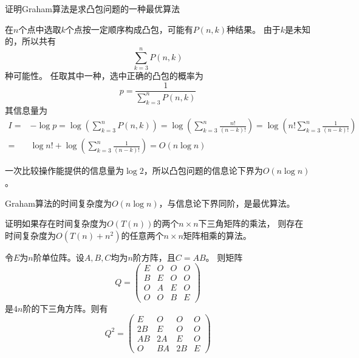 \begin{questions}
\begin{solution}
    \end{solution}

    \question  证明Graham算法是求凸包问题的一种最优算法

    \begin{solution}
        在$n$个点中选取$k$个点按一定顺序构成凸包，可能有$P(n, k)$种结果。
        由于$k$是未知的，所以共有\[
            \sum_{k = 3}^{n} P(n,k)
        \]种可能性。
        任取其中一种，选中正确的凸包的概率为\[
            p = \frac{1}{\sum_{k = 3}^{n} P(n,k)}
        \]
        其信息量为
        \begin{align*}
            I = & - \log p = \log \left( \sum_{k = 3}^{n} P(n,k) \right)
            = \log \left( \sum_{k = 3}^{n} \frac{n!}{(n-k)!} \right)
            =  \log \left( n! \sum_{k = 3}^{n} \frac{1}{(n-k)!} \right)          \\
            =   & \log n! + \log \left(\sum_{k = 3}^{n} \frac{1}{(n-k)!} \right)
            =  O(n \log n)
        \end{align*}

        一次比较操作能提供的信息量为$\log 2$，所以凸包问题的信息论下界为$O(n \log n)$。

        Graham算法的时间复杂度为$O(n\log n)$，与信息论下界同阶，是最优算法。

    \end{solution}

    \question 证明如果存在时间复杂度为$O(T(n))$的两个$n \times n$下三角矩阵的乘法，
    则存在时间复杂度为$O(T(n)+n^2)$的任意两个$n \times n$矩阵相乘的算法。

    \begin{solution}
        令$E$为$n$阶单位阵。设$A,B,C$均为$n$阶方阵，且$C = AB$。
        则矩阵\[
            Q = \begin{pmatrix}
                E & O & O & O \\
                B & E & O & O \\
                O & A & E & O \\
                O & O & B & E
            \end{pmatrix}
        \]是$4n$阶的下三角方阵。则有
        \[
            Q^2 = \begin{pmatrix}
                E  & O  & O  & O \\
                2B & E  & O  & O \\
                AB & 2A & E  & O \\
                O  & BA & 2B & E
            \end{pmatrix}
        \]


\end{solution}
\end{questions}
